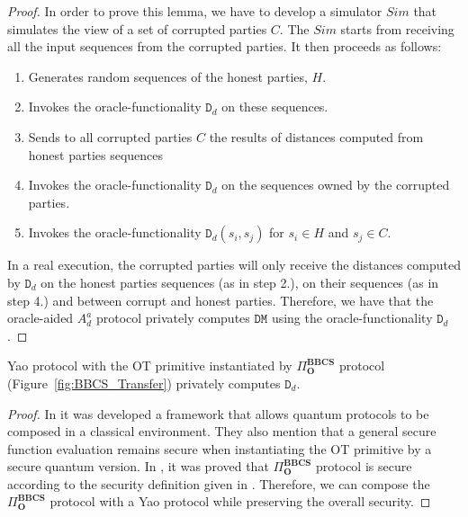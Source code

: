 \begin{proof}
In order to prove this lemma, we have to develop a simulator $Sim$ that simulates the view of a set of corrupted parties $C$. The $Sim$ starts from receiving all the input sequences from the corrupted parties. It then proceeds as follows:

\begin{enumerate}
    \item Generates random sequences of the honest parties, $H$.
    \item Invokes the oracle-functionality $\mathtt{D}_d$ on these sequences.
    \item Sends to all corrupted parties $C$ the results of distances computed from honest parties sequences
    \item Invokes the oracle-functionality $\mathtt{D}_d$ on the sequences owned by the corrupted parties.
    \item Invokes the oracle-functionality $\mathtt{D}_d(s_i, s_j)$ for $s_i\in H$ and $s_j\in C$. 
\end{enumerate}

In a real execution, the corrupted parties will only receive the distances computed by $\mathtt{D}_d$ on the honest parties sequences (as in step 2.), on their sequences (as in step 4.) and between corrupt and honest parties. Therefore, we have that the oracle-aided $A^a_d$ protocol privately computes $\mathtt{DM}$ using the oracle-functionality $\mathtt{D}_d$.

\end{proof}

\begin{lemma}\label{secondlemma}
Yao protocol with the OT primitive instantiated by $\Pi^{\textbf{BBCS}}_{\textbf{O}}$ protocol (Figure~\ref{fig:BBCS_Transfer}) privately computes $\mathtt{D}_d$.
\end{lemma}

\begin{proof}

In \cite{FS09} it was developed a framework that allows quantum protocols to be composed in a classical environment. They also mention that a general secure function evaluation remains secure when instantiating the OT primitive by a secure quantum version. In \cite{DFL+09}, it was proved that $\Pi^{\textbf{BBCS}}_{\textbf{O}}$ protocol is secure according to the security definition given in \cite{FS09}. Therefore, we can compose the $\Pi^{\textbf{BBCS}}_{\textbf{O}}$ protocol with a Yao protocol \cite{Lindell2008} while preserving the overall security. 

\end{proof}

